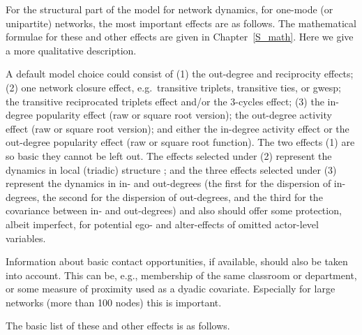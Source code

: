 \documentclass[a4paper,fleqn,11pt]{article}
\newcommand{\+}{\, + \,}
\begin{document}
For the structural part of the model for network dynamics,
for one-mode (or unipartite) networks,
the most important effects are as follows.
The mathematical formulae for these and other effects are given
in Chapter~\ref{S_math}. Here we give a more qualitative description.

A default model choice could consist of (1) the out-degree and reciprocity
effects; (2) one network closure effect,
e.g.\ transitive triplets, transitive ties, or gwesp;
the transitive reciprocated triplets effect
and/or the 3-cycles effect;
(3) the in-degree popularity effect (raw or square root version);
the out-degree activity effect (raw or square root version);
and either the in-degree activity effect or the out-degree popularity effect
(raw or square root function).
The two effects (1) are so basic they cannot be left out.
The effects selected under (2) represent the dynamics in local (triadic) structure
\citep[also see][for the transitive reciprocated triplets effect]{Block2015};
and the three effects selected under (3) represent the dynamics
in in- and out-degrees (the first for the dispersion of in-degrees,
the second for the dispersion of out-degrees, and the third for the
covariance between in- and out-degrees) and also should offer
some protection, albeit imperfect, for potential ego- and alter-effects
of omitted actor-level variables.

Information about basic contact opportunities, if available,
should also be taken into account. This can be, e.g., membership
of the same classroom or department, or some measure of
proximity used as a dyadic covariate. Especially for large networks
(more than 100 nodes) this is important.

The basic list of these and other effects is as follows.
\end{document}
